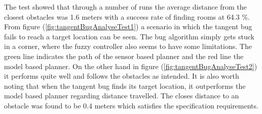 \documentclass[../Head/Main.tex]{subfiles}
\begin{document}
The test showed that through a number of runs the average distance from the closest obstacles was 1.6 meters with a success rate of finding rooms at 64.3 \%. From figure (\ref{fig:tangentBugAnalyseTest1}) a scenario in which the tangent bug fails to reach a target location can be seen. The bug algorithm simply gets stuck in a corner, where the fuzzy controller also seems to have some limitations. The green line indicates the path of the sensor based planner and the red line the model based planner. On the other hand in figure (\ref{fig:tangentBugAnalyseTest2}) it performs quite well and follows the obstacles as intended. It is also worth noting that when the tangent bug finds its target location, it outperforms the model based planner regarding distance travelled. The closes distance to an obstacle was found to be 0.4 meters which satisfies the specification requirements. 
\end{document}
